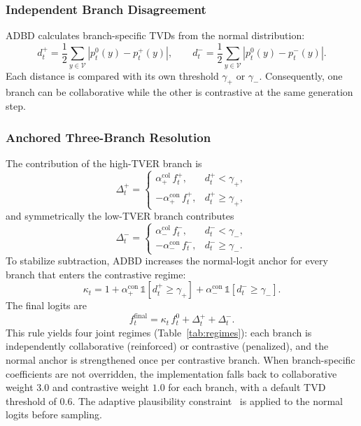 \subsubsection{Independent Branch Disagreement}

ADBD calculates branch-specific TVDs from the normal distribution:
\begin{equation}
d_t^{+} = \frac{1}{2}\sum_{y \in \mathcal{V}} \left|p_t^{0}(y) - p_t^{+}(y)\right|, \qquad
d_t^{-} = \frac{1}{2}\sum_{y \in \mathcal{V}} \left|p_t^{0}(y) - p_t^{-}(y)\right|.
\end{equation}
Each distance is compared with its own threshold $\gamma_{+}$ or $\gamma_{-}$. Consequently, one branch can be collaborative while the other is contrastive at the same generation step.

\subsubsection{Anchored Three-Branch Resolution}

The contribution of the high-TVER branch is
\begin{equation}
\Delta_t^{+} =
\begin{cases}
\alpha_{+}^{\mathrm{col}}\, f_t^{+}, & d_t^{+} < \gamma_{+}, \\
-\alpha_{+}^{\mathrm{con}}\, f_t^{+}, & d_t^{+} \geq \gamma_{+},
\end{cases}
\end{equation}
and symmetrically the low-TVER branch contributes
\begin{equation}
\Delta_t^{-} =
\begin{cases}
\alpha_{-}^{\mathrm{col}}\, f_t^{-}, & d_t^{-} < \gamma_{-}, \\
-\alpha_{-}^{\mathrm{con}}\, f_t^{-}, & d_t^{-} \geq \gamma_{-}.
\end{cases}
\end{equation}
To stabilize subtraction, ADBD increases the normal-logit anchor for every branch that enters the contrastive regime:
\begin{equation}
\kappa_t = 1 + \alpha_{+}^{\mathrm{con}}\, \mathbb{1}\!\left[d_t^{+} \geq \gamma_{+}\right] + \alpha_{-}^{\mathrm{con}}\, \mathbb{1}\!\left[d_t^{-} \geq \gamma_{-}\right].
\end{equation}
The final logits are
\begin{equation}
f_t^{\mathrm{final}} = \kappa_t\, f_t^{0} + \Delta_t^{+} + \Delta_t^{-}.
\end{equation}
This rule yields four joint regimes (Table~\ref{tab:regimes}): each branch is independently collaborative (reinforced) or contrastive (penalized), and the normal anchor is strengthened once per contrastive branch. When branch-specific coefficients are not overridden, the implementation falls back to collaborative weight $3.0$ and contrastive weight $1.0$ for each branch, with a default TVD threshold of $0.6$. The adaptive plausibility constraint~\cite{li2023contrastive} is applied to the normal logits before sampling.

